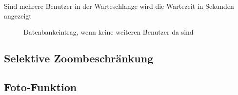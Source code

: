 Sind mehrere Benutzer in der Warteschlange wird die Wartezeit in Sekunden angezeigt
\begin{figure}[h!]
	\centering
	\caption{Datenbankeintrag, wenn keine weiteren Benutzer da sind}
	\label{img:tblqueue}
\end{figure}

\subsection{Selektive Zoombeschränkung}



\subsection{Foto-Funktion}
